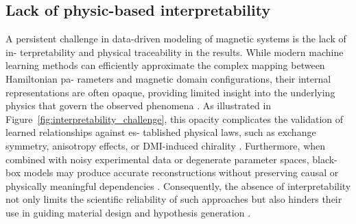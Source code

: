 \documentclass[letterpaper, 12, one column]{article}
\renewcommand{\arraystretch}{1.15}
\begin{document}
\begin{table}[H]
\centering
\caption{Approximate operational costs and limitations of magnetic imaging techniques.}
\label{tab:experimental_costs_monetary}
\renewcommand{\arraystretch}{2}
\large
{}
\end{table}


\subsection{Lack of physic-based interpretability}
A persistent challenge in data-driven modeling of magnetic systems is the lack of in-
terpretability and physical traceability in the results. While modern machine learning
methods can efficiently approximate the complex mapping between Hamiltonian pa-
rameters and magnetic domain configurations, their internal representations are often
opaque, providing limited insight into the underlying physics that govern the observed
phenomena \cite{Park2024}. As illustrated in Figure~\ref{fig:interpretability_challenge}, this opacity complicates the validation of learned relationships against es-
tablished physical laws, such as exchange symmetry, anisotropy effects, or DMI-induced
chirality \cite{Ahmadi2024PhysicsInformed}. Furthermore, when combined with noisy experimental data or degenerate
parameter spaces, black-box models may produce accurate reconstructions without
preserving causal or physically meaningful dependencies \cite{Liao2023}. Consequently, the absence
of interpretability not only limits the scientific reliability of such approaches but also
hinders their use in guiding material design and hypothesis generation \cite{Sahin2025Unlocking}.
\end{document}
